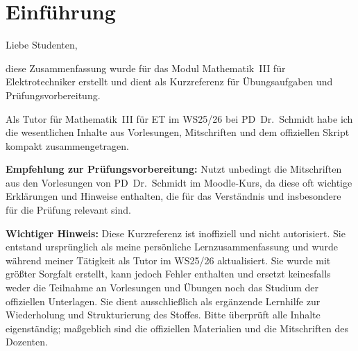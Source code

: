 \documentclass[a4paper,11pt,oneside,open=any,parskip=half, DIV=15]{scrreprt}
\newcommand{\TitleBlockWidth}{0.60\paperwidth}
\newcommand{\TitleLineGap}{1.0em}
\newcommand{\TitleText}[1]{\textcolor{titlefg}{#1}}
\newcommand{\SubtitleText}[1]{\textcolor{subtitlefg}{#1}}
\begin{document}

\begin{titlepage}


\end{titlepage}

\pagecolor{white}
\cleardoublepage{}


\section*{Einführung}
   Liebe Studenten,

   diese Zusammenfassung wurde für das Modul Mathematik~III für Elektrotechniker erstellt und dient als Kurzreferenz für Übungsaufgaben und Prüfungsvorbereitung.

   Als Tutor für Mathematik~III für ET im WS25/26 bei PD~Dr.\ Schmidt habe ich die wesentlichen Inhalte aus Vorlesungen, Mitschriften und dem offiziellen Skript kompakt zusammengetragen. 

   \textbf{Empfehlung zur Prüfungsvorbereitung:} Nutzt unbedingt die Mitschriften aus den Vorlesungen von PD~Dr.\ Schmidt im Moodle-Kurs, da diese oft wichtige Erklärungen und Hinweise enthalten, die für das Verständnis und insbesondere für die Prüfung relevant sind.

   \vspace{0.5em}
   \textbf{Wichtiger Hinweis:}
   Diese Kurzreferenz ist inoffiziell und nicht autorisiert. Sie entstand ursprünglich als meine persönliche Lernzusammenfassung und wurde während meiner Tätigkeit als Tutor im WS25/26 aktualisiert. Sie wurde mit größter Sorgfalt erstellt, kann jedoch Fehler enthalten und ersetzt keinesfalls weder die Teilnahme an Vorlesungen und Übungen noch das Studium der offiziellen Unterlagen.\newline
   Sie dient ausschließlich als ergänzende Lernhilfe zur Wiederholung und Strukturierung des Stoffes. Bitte überprüft alle Inhalte eigenständig; maßgeblich sind die offiziellen Materialien und die Mitschriften des Dozenten.
\end{document}
